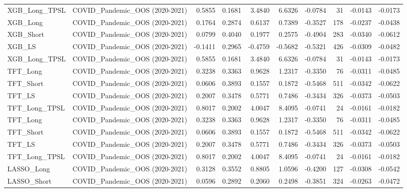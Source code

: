 \begin{tabular}{llrrrrrrrr}
\cline{1-10}
XGB\_Long\_TPSL & COVID\_Pandemic\_OOS (2020-2021) & 0.5855 & 0.1681 & 3.4840 & 6.6326 & -0.0784 & 31 & -0.0143 & -0.0173 \\
\cline{1-10}
XGB\_Long & COVID\_Pandemic\_OOS (2020-2021) & 0.1764 & 0.2874 & 0.6137 & 0.7389 & -0.3527 & 178 & -0.0237 & -0.0438 \\
\cline{1-10}
XGB\_Short & COVID\_Pandemic\_OOS (2020-2021) & 0.0799 & 0.4040 & 0.1977 & 0.2575 & -0.4904 & 283 & -0.0340 & -0.0612 \\
\cline{1-10}
XGB\_LS & COVID\_Pandemic\_OOS (2020-2021) & -0.1411 & 0.2965 & -0.4759 & -0.5682 & -0.5321 & 426 & -0.0309 & -0.0482 \\
\cline{1-10}
XGB\_Long\_TPSL & COVID\_Pandemic\_OOS (2020-2021) & 0.5855 & 0.1681 & 3.4840 & 6.6326 & -0.0784 & 31 & -0.0143 & -0.0173 \\
\cline{1-10}
TFT\_Long & COVID\_Pandemic\_OOS (2020-2021) & 0.3238 & 0.3363 & 0.9628 & 1.2317 & -0.3350 & 76 & -0.0311 & -0.0485 \\
\cline{1-10}
TFT\_Short & COVID\_Pandemic\_OOS (2020-2021) & 0.0606 & 0.3893 & 0.1557 & 0.1872 & -0.5468 & 511 & -0.0342 & -0.0622 \\
\cline{1-10}
TFT\_LS & COVID\_Pandemic\_OOS (2020-2021) & 0.2007 & 0.3478 & 0.5771 & 0.7486 & -0.3434 & 326 & -0.0373 & -0.0503 \\
\cline{1-10}
TFT\_Long\_TPSL & COVID\_Pandemic\_OOS (2020-2021) & 0.8017 & 0.2002 & 4.0047 & 8.4095 & -0.0741 & 24 & -0.0161 & -0.0182 \\
\cline{1-10}
TFT\_Long & COVID\_Pandemic\_OOS (2020-2021) & 0.3238 & 0.3363 & 0.9628 & 1.2317 & -0.3350 & 76 & -0.0311 & -0.0485 \\
\cline{1-10}
TFT\_Short & COVID\_Pandemic\_OOS (2020-2021) & 0.0606 & 0.3893 & 0.1557 & 0.1872 & -0.5468 & 511 & -0.0342 & -0.0622 \\
\cline{1-10}
TFT\_LS & COVID\_Pandemic\_OOS (2020-2021) & 0.2007 & 0.3478 & 0.5771 & 0.7486 & -0.3434 & 326 & -0.0373 & -0.0503 \\
\cline{1-10}
TFT\_Long\_TPSL & COVID\_Pandemic\_OOS (2020-2021) & 0.8017 & 0.2002 & 4.0047 & 8.4095 & -0.0741 & 24 & -0.0161 & -0.0182 \\
\cline{1-10}
LASSO\_Long & COVID\_Pandemic\_OOS (2020-2021) & 0.3128 & 0.3552 & 0.8805 & 1.0596 & -0.4200 & 127 & -0.0308 & -0.0542 \\
\cline{1-10}
LASSO\_Short & COVID\_Pandemic\_OOS (2020-2021) & 0.0596 & 0.2892 & 0.2060 & 0.2498 & -0.3851 & 324 & -0.0263 & -0.0472 \\

\end{tabular}
